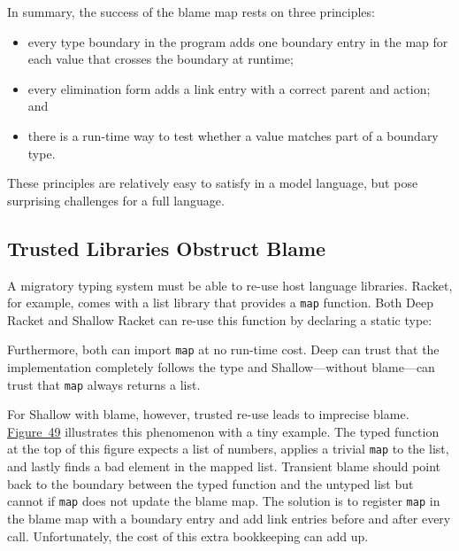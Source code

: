 \documentclass[ twoside,open=right,titlepage,numbers=noenddot,headinclude,%
                footinclude=true,cleardoublepage=empty,abstract=off,
                BCOR=5mm,paper=a4,fontsize=11pt,%
                ngerman,american,%
                parts,pdfspacing]{scrreprt}
\newcommand{\Scribtexttt}[1]{{\texttt{#1}}}
\newlength{\stabLeft}
\newcommand{\atItemizeStart}[0]{\addtolength{\stabLeft}{\labelsep}
                                \addtolength{\stabLeft}{\labelwidth}}
\newcommand{\Ssubsubsection}[2]{\subsubsection[#1]{#2}}
\newcommand{\FigureRef}[2]{#1}
\renewcommand{\Ssubsubsection}[2]{\subsection[#1]{#2}}
\begin{document}
In summary, the success of the blame map rests on three principles:


\noindent \begin{itemize}\atItemizeStart

\item every type boundary in the program adds one boundary entry in the
 map for each value that crosses the boundary at runtime;

\item every elimination form adds a link entry with a correct parent and action; and

\item there is a run{-}time way to test whether a value matches part of
 a boundary type.\end{itemize}

\noindent These principles are relatively easy to satisfy in a model language,
 but pose surprising challenges for a full language.

\Ssubsubsection{Trusted Libraries Obstruct Blame}{Trusted Libraries Obstruct Blame}\label{t:x28part_x22Trustedx5fLibrariesx5fObstructx5fBlamex22x29}

A migratory typing system must be able to re{-}use host language libraries.
Racket, for example, comes with a list library that provides a \Scribtexttt{map}
 function.
Both Deep Racket and Shallow Racket can re{-}use this function by
 declaring a static type:


\noindent{}Furthermore, both can import \Scribtexttt{map} at no run{-}time cost.
Deep can trust that the implementation completely follows the type
 and Shallow{---}without blame{---}can trust that \Scribtexttt{map} always returns a list.

For Shallow with blame, however, trusted re{-}use leads to imprecise blame.
\hyperref[t:x28counter_x28x22figurex22_x22figx3atransientx3ablamex3amapx22x29x29]{Figure~\FigureRef{49}{t:x28counter_x28x22figurex22_x22figx3atransientx3ablamex3amapx22x29x29}} illustrates this phenomenon with a tiny example.
The typed function at the top of this figure expects a list of numbers,
 applies a trivial \Scribtexttt{map} to the list,
 and lastly finds a bad element in the mapped list.
Transient blame should point back to the boundary between the typed
 function and the untyped list but cannot if \Scribtexttt{map} does
 not update the blame map.
The solution is to register \Scribtexttt{map} in the blame map with a boundary entry
 and add link entries before and after every call.
Unfortunately, the cost of this extra bookkeeping can add up.
\end{document}
